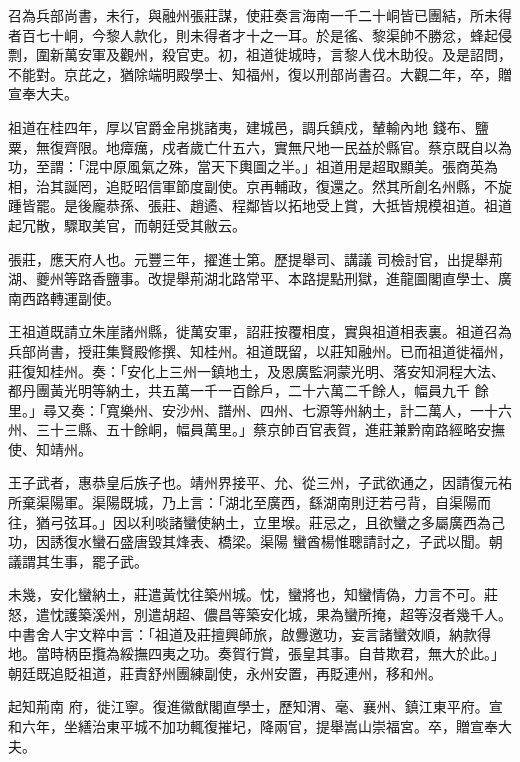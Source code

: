 \begin{pinyinscope}
 召為兵部尚書，未行，與融州張莊謀，使莊奏言海南一千二十峒皆已團結，所未得者百七十峒，今黎人款化，則未得者才十之一耳。於是徭、黎渠帥不勝忿，蜂起侵剽，圍新萬安軍及觀州，殺官吏。初，祖道徙城時，言黎人伐木助役。及是詔問，不能對。京芘之，猶除端明殿學士、知福州，復以刑部尚書召。大觀二年，卒，贈宣奉大夫。



 祖道在桂四年，厚以官爵金帛挑諸夷，建城邑，調兵鎮戍，輦輸內地
 錢布、鹽粟，無復齊限。地瘴癘，戍者歲亡什五六，實無尺地一民益於縣官。蔡京既自以為功，至謂：「混中原風氣之殊，當天下輿圖之半。」祖道用是超取顯美。張商英為相，治其誕罔，追貶昭信軍節度副使。京再輔政，復還之。然其所創名州縣，不旋踵皆罷。是後龐恭孫、張莊、趙遹、程鄰皆以拓地受上賞，大抵皆規模祖道。祖道起冗散，驟取美官，而朝廷受其敝云。



 張莊，應天府人也。元豐三年，擢進士第。歷提舉司、講議
 司檢討官，出提舉荊湖、夔州等路香鹽事。改提舉荊湖北路常平、本路提點刑獄，進龍圖閣直學士、廣南西路轉運副使。



 王祖道既請立朱崖諸州縣，徙萬安軍，詔莊按覆相度，實與祖道相表裏。祖道召為兵部尚書，授莊集賢殿修撰、知桂州。祖道既留，以莊知融州。已而祖道徙福州，莊復知桂州。奏：「安化上三州一鎮地土，及恩廣監洞蒙光明、落安知洞程大法、都丹團黃光明等納土，共五萬一千一百餘戶，二十六萬二千餘人，幅員九千
 餘里。」尋又奏：「寬樂州、安沙州、譜州、四州、七源等州納土，計二萬人，一十六州、三十三縣、五十餘峒，幅員萬里。」蔡京帥百官表賀，進莊兼黔南路經略安撫使、知靖州。



 王子武者，惠恭皇后族子也。靖州界接平、允、從三州，子武欲通之，因請復元祐所棄渠陽軍。渠陽既城，乃上言：「湖北至廣西，繇湖南則迂若弓背，自渠陽而往，猶弓弦耳。」因以利啖諸蠻使納土，立里堠。莊忌之，且欲蠻之多屬廣西為己功，因誘復水蠻石盛唐毀其烽表、橋梁。渠陽
 蠻酋楊惟聰請討之，子武以聞。朝議謂其生事，罷子武。



 未幾，安化蠻納土，莊遣黃忱往築州城。忱，蠻將也，知蠻情偽，力言不可。莊怒，遣忱護築溪州，別遣胡超、儂昌等築安化城，果為蠻所掩，超等沒者幾千人。中書舍人宇文粹中言：「祖道及莊擅興師旅，啟釁邀功，妄言諸蠻效順，納款得地。當時柄臣攬為綏撫四夷之功。奏賀行賞，張皇其事。自昔欺君，無大於此。」朝廷既追貶祖道，莊責舒州團練副使，永州安置，再貶連州，移和州。



 起知荊南
 府，徙江寧。復進徽猷閣直學士，歷知渭、毫、襄州、鎮江東平府。宣和六年，坐繕治東平城不加功輒復摧圮，降兩官，提舉嵩山崇福宮。卒，贈宣奉大夫。




\end{pinyinscope}
